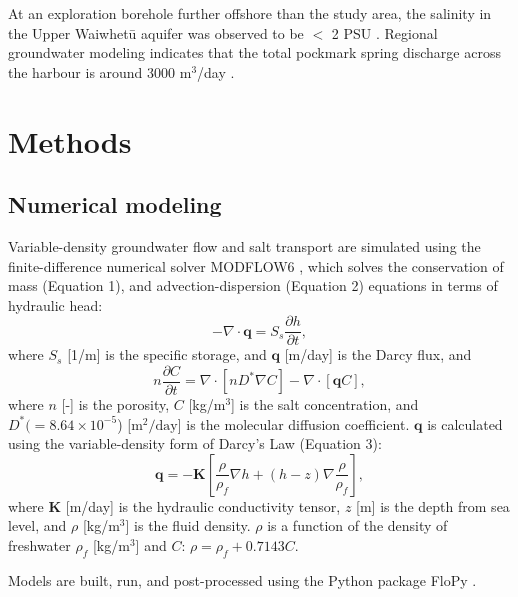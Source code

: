 \documentclass[draft, 10pt]{agujournal2019}
\begin{document}
At an exploration borehole further offshore than the study area, the salinity in the Upper Waiwhetū aquifer was observed to be $<$ 2 PSU \cite{gyopari_wellington_2018}. Regional groundwater modeling indicates that the total pockmark spring discharge across the harbour is around 3000 m$^3$/day \cite{bennett_hutt_2024}.

\section{Methods}\label{methods}

\subsection{Numerical modeling}

Variable-density groundwater flow and salt transport are simulated using the finite-difference numerical solver MODFLOW6 \cite{langevin_documentation_2017}, which solves the conservation of mass (Equation 1), and advection-dispersion (Equation 2) equations in terms of hydraulic head: 
\begin{equation} \label{eq:comhead}
-\nabla \cdot \boldsymbol{q}=S_s\frac{\partial h}{\partial t},
\end{equation}
where $S_s$ [1/m] is the specific storage,  and $\boldsymbol{q}$ [m/day] is the Darcy flux, and
\begin{equation} \label{eq:consconc} 
n\frac{\partial C}{\partial t}=\nabla\cdot\left[nD^{\ast}\nabla C\right]-\nabla \cdot \left[\boldsymbol{q} C \right],
\end{equation}
where $n$ [-] is the porosity,   $C$ [kg/m$^3$] is the salt concentration, and $D^*(=8.64\times10^{-5} $) [$\mathrm{m}^2/\mathrm{day}$] is the molecular diffusion coefficient. $\boldsymbol{q}$ is calculated using the variable-density form of Darcy's Law (Equation 3):
\begin{equation}
\boldsymbol{q} = -\boldsymbol{K}\left[ \frac{\rho}{\rho_f}\nabla h +(h-z)\nabla\frac{\rho}{\rho_f}\right],
\end{equation}
where  $\textbf{K}$ [m/day] is the hydraulic conductivity tensor, $z$ [m] is the depth from sea level,  and $\rho$ [kg/m$^3$] is the fluid density. $\rho$ is a function of the density of freshwater $\rho_f$ [kg/m$^3$] and  $C$: $\rho = \rho_f + 0.7143C$. 

 Models are built, run, and post-processed using the Python package FloPy \cite{bakker_scripting_2016}. 
\end{document}
